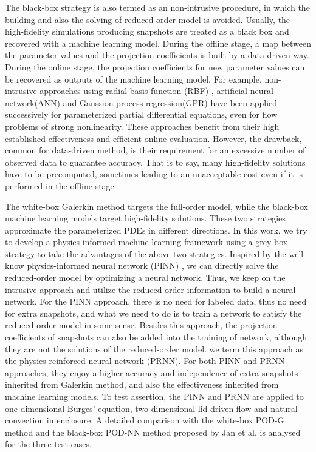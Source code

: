 \documentclass[preprint, 10pt]{elsarticle}
\begin{document}
The black-box strategy is also termed as an non-intrusive procedure, in which the building and also the solving of reduced-order model is avoided. Usually, the high-fidelity simulations producing snapshots are treated as a black box and recovered with a machine learning model.
During the offline stage, a map between the parameter values and the projection coefficients is built by a data-driven way. During the online stage, the projection coefficients for new parameter values can be recovered as outputs of the machine learning model.  For example, non-intrusive approaches using radial basis function (RBF) \cite{chen2018greedy, walton2013reduced, xiao2015non}, artificial neural network(ANN) \cite{hesthaven2018non} and Gaussion process regression(GPR) \cite{guo2019data} have been applied successively for parameterized partial differential equations, even for flow problems of strong nonlinearity. These approaches benefit from their high established effectiveness and efficient online evaluation. However, the drawback, common for data-driven method, is their requirement for an excessive number of observed data to guarantee accuracy. That is to say, many high-fidelity solutions have to be precomputed,  sometimes leading to an unacceptable cost even if it is performed in the offline stage \cite{hesthaven2018non}.


The white-box Galerkin method targets the full-order model, while the black-box machine learning models target high-fidelity solutions. These two strategies approximate the parameterized PDEs in different directions.
In this work,  we try to develop a physics-informed machine learning framework using a grey-box strategy to take the advantages of the above two strategies.
Inspired by the well-know physics-informed neural network (PINN) \cite{raissi2019physics, raissi2020hidden, mao2020physics}, we can directly solve the reduced-order model by  optimizing a neural network.
Thus, we keep on the intrusive approach and utilize the reduced-order information to build a neural network.
For the PINN approach, there is no need for labeled data, thus no need for extra snapshots, and what we need to do is to train a network to satisfy the reduced-order model in some sense.
Besides this approach,  the projection coefficients of snapshots can also be added into the training of network, although they are not the solutions of the reduced-order model. we term this approach as the physics-reinforced neural network (PRNN).
For both PINN and PRNN approaches, they enjoy a higher accuracy and independence of extra snapshots inherited from Galerkin method, and also the effectiveness inherited from machine learning models.
To test assertion, the PINN and PRNN are applied to one-dimensional Burges' equation, two-dimensional lid-driven flow and natural convection in enclosure. A detailed comparison with the white-box POD-G method and the black-box POD-NN method proposed by Jan et al.\cite{hesthaven2018non} is analysed for the three test cases.
\end{document}
